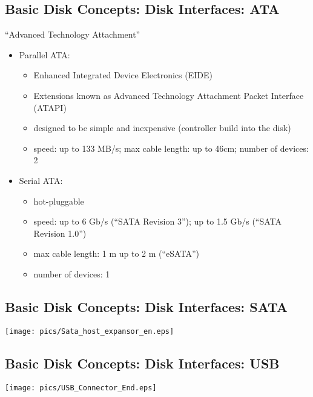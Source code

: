 \documentclass[xga]{xdvislides}
\begin{document}
\subsection{Basic Disk Concepts: Disk Interfaces: ATA}
``Advanced Technology Attachment''
\begin{itemize}
	\item Parallel ATA:
	\begin{itemize}
		\item Enhanced Integrated Device Electronics (EIDE)
		\item Extensions known as Advanced Technology Attachment Packet
			Interface (ATAPI)
		\item designed to be simple and inexpensive (controller build
			into the disk)
		\item speed: up to 133 MB/s; max cable length: up to 46cm; number of devices: 2
	\end{itemize}
	\item Serial ATA:
	\begin{itemize}
		\item hot-pluggable
		\item speed: up to 6 Gb/s (``SATA Revision 3''); up to 1.5 Gb/s (``SATA Revision 1.0'')
		\item max cable length: 1 m up to 2 m (``eSATA'')
		\item number of devices: 1
	\end{itemize}
\end{itemize}

\subsection{Basic Disk Concepts: Disk Interfaces: SATA}
	\begin{center}
		\texttt{[image: pics/Sata\_host\_expansor\_en.eps]} \\
	\end{center}


\subsection{Basic Disk Concepts: Disk Interfaces: USB}
\vfill
	\begin{center}
		\texttt{[image: pics/USB\_Connector\_End.eps]} \\
	\end{center}
\vfill
\end{document}
